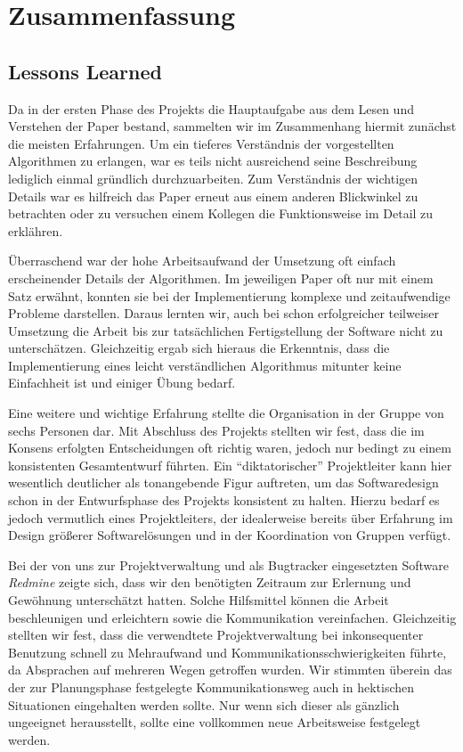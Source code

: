 \section{Zusammenfassung}

  \subsection{Lessons Learned}
  
    Da in der ersten Phase des Projekts die Hauptaufgabe aus dem Lesen und
    Verstehen der Paper bestand, sammelten wir im Zusammenhang hiermit zunächst
    die meisten Erfahrungen. Um ein tieferes Verständnis der vorgestellten
    Algorithmen zu erlangen, war es teils nicht ausreichend seine Beschreibung
    lediglich einmal gründlich durchzuarbeiten. Zum Verständnis der wichtigen Details
    war es hilfreich das Paper erneut aus einem anderen Blickwinkel zu
    betrachten oder zu versuchen einem Kollegen die Funktionsweise im Detail zu
    erklähren.

    Überraschend war der hohe Arbeitsaufwand der Umsetzung oft einfach erscheinender
    Details der Algorithmen. Im jeweiligen Paper oft nur mit einem Satz
    erwähnt, konnten sie bei der Implementierung komplexe und zeitaufwendige
    Probleme darstellen. Daraus lernten wir, auch bei schon erfolgreicher
    teilweiser Umsetzung die Arbeit bis zur tatsächlichen Fertigstellung der
    Software nicht zu unterschätzen. Gleichzeitig ergab sich hieraus die
    Erkenntnis, dass die Implementierung eines leicht verständlichen Algorithmus mitunter
    keine Einfachheit ist und einiger Übung bedarf.

    Eine weitere und wichtige Erfahrung stellte die Organisation in der Gruppe von
    sechs Personen dar. Mit Abschluss des Projekts stellten wir fest, dass die
    im Konsens erfolgten Entscheidungen oft richtig waren, jedoch nur bedingt zu
    einem konsistenten Gesamtentwurf führten. Ein \enquote{diktatorischer} 
    Projektleiter kann hier wesentlich deutlicher als tonangebende Figur auftreten,
    um das Softwaredesign schon in der Entwurfsphase des Projekts konsistent zu halten. 
    Hierzu bedarf es jedoch vermutlich eines Projektleiters, der idealerweise bereits über
    Erfahrung im Design größerer Softwarelösungen und in der Koordination von Gruppen verfügt.

    Bei der von uns zur Projektverwaltung und als Bugtracker eingesetzten Software
    \emph{Redmine} zeigte sich, dass wir den benötigten Zeitraum zur Erlernung und
    Gewöhnung unterschätzt hatten. Solche Hilfsmittel können die Arbeit
    beschleunigen und erleichtern sowie die Kommunikation vereinfachen.
    Gleichzeitig stellten wir fest, dass die verwendtete Projektverwaltung bei
    inkonsequenter Benutzung schnell zu Mehraufwand und
    Kommunikationsschwierigkeiten führte, da Absprachen auf mehreren Wegen
    getroffen wurden. Wir stimmten überein das der zur Planungsphase
    festgelegte Kommunikationsweg auch in hektischen Situationen eingehalten
    werden sollte. Nur wenn sich dieser als gänzlich ungeeignet herausstellt,
    sollte eine vollkommen neue Arbeitsweise festgelegt werden.

